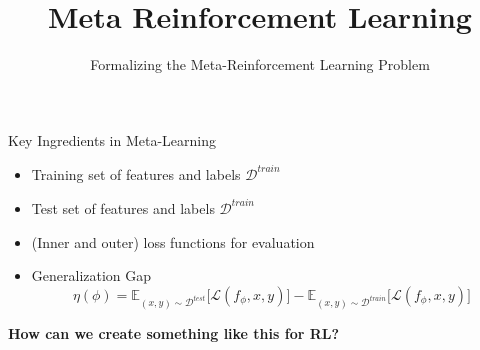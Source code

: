 \documentclass[aspectratio=169]{../latex_main/tntbeamer}  %
\title[Meta-RL]{Meta Reinforcement Learning}
\subtitle{Formalizing the Meta-Reinforcement Learning Problem}
\begin{document}
	
\maketitle

\begin{frame}{Key Ingredients in Meta-Learning}

    \begin{itemize}
        \item Training set of features and labels $\mathcal{D}^{train}$
        \item Test set of features and labels $\mathcal{D}^{train}$
        \item (Inner and outer) loss functions for evaluation
        \item Generalization Gap \[
            \eta(\phi) = \mathbb{E}_{(x,y) \sim \mathcal{D}^{test}}\big [\mathcal{L} (f_\phi, x, y)] - \mathbb{E}_{(x,y) \sim \mathcal{D}^{train}}\big [\mathcal{L} (f_\phi, x, y)] 
        \]
    \end{itemize}
    
    \vfill 
    
    \pause
    \centering
    \textbf{How can we create something like this for RL?}

\end{frame}
\end{document}
